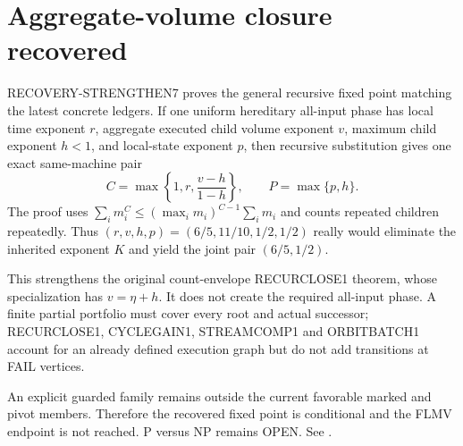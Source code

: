 \section{Aggregate-volume closure recovered}
RECOVERY-STRENGTHEN7 proves the general recursive fixed point matching the
latest concrete ledgers.  If one uniform hereditary all-input phase has local
time exponent $r$, aggregate executed child volume exponent $v$, maximum
child exponent $h<1$, and local-state exponent $p$, then recursive
substitution gives one exact same-machine pair
\[
 C=\max\left\{1,r,\frac{v-h}{1-h}\right\},\qquad
 P=\max\{p,h\}.
\]
The proof uses $\sum_i m_i^C\le(\max_i m_i)^{C-1}\sum_i m_i$ and counts
repeated children repeatedly.  Thus
$(r,v,h,p)=(6/5,11/10,1/2,1/2)$ really would eliminate the inherited
exponent $K$ and yield the joint pair $(6/5,1/2)$.

This strengthens the original count-envelope RECURCLOSE1 theorem, whose
specialization has $v=\eta+h$.  It does not create the required all-input
phase.  A finite partial portfolio must cover every root and actual successor;
RECURCLOSE1, CYCLEGAIN1, STREAMCOMP1 and ORBITBATCH1 account for an already
defined execution graph but do not add transitions at FAIL vertices.

An explicit guarded family remains outside the current favorable marked and
pivot members.  Therefore the recovered fixed point is conditional and the
FLMV endpoint is not reached.  P versus NP remains OPEN.  See
.
